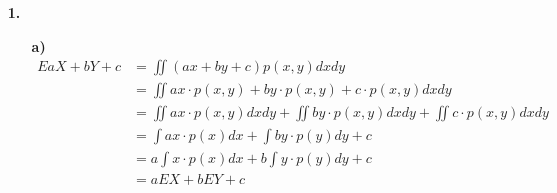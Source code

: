 \documentclass[a4paper,11pt]{article}
\author{\authorinfotitle}
\title{\titleinfo}
\date{\today}
\begin{document}
	\maketitle
	\begin{enumerate}
		\item[\textbf{1.}]
		
		\begin{enumerate}
		\item[\textbf{a)}]
		\begin{align*}
		E{aX+bY+c} &= \iint (ax+by+c)p(x,y)dxdy\\
				   &= \iint ax \cdot p(x,y) + by \cdot p(x,y) + c \cdot p(x,y) dxdy\\
				   &= \iint ax \cdot p(x,y) dxdy + \iint by \cdot p(x,y) dxdy + \iint c \cdot p(x,y) dxdy\\
				  &= \int ax \cdot p(x) dx + \int by \cdot p(y) dy +  c\\ 
				  &= a\int x \cdot p(x) dx + b\int y \cdot p(y) dy +  c\\ 
				  &= aE{X} + bE{Y} +  c\\ 
		\end{align*}
		\end{enumerate}
	\end{enumerate}
\end{document}
